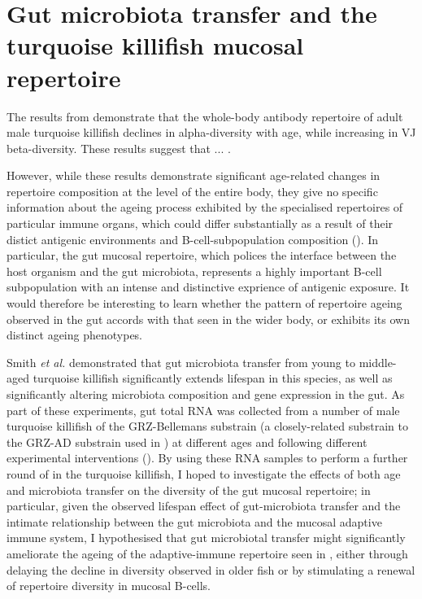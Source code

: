 
\section{Gut microbiota transfer and the turquoise killifish mucosal repertoire}
\label{sec:igseq_gut}

The results from  demonstrate that the whole-body antibody repertoire of adult male turquoise killifish declines in %
alpha-diversity with age, while increasing in VJ beta-diversity. %
These results suggest that ... . %

However, while these results demonstrate significant age-related changes in repertoire composition at the level of the entire body, they give no specific information about the ageing process exhibited by the specialised repertoires of particular immune organs, which could differ substantially as a result of their distict antigenic environments and B-cell-subpopulation composition (). In particular, the gut mucosal repertoire, which polices the interface between the host organism and the gut microbiota, represents a highly important B-cell subpopulation with an intense and distinctive exprience of antigenic exposure. %
It would therefore be interesting to learn whether the pattern of repertoire ageing observed in the gut accords with that seen in the wider body, or exhibits its own distinct ageing phenotypes.

Smith \textit{et al.} \parencite{smith2017microbiota} demonstrated that gut microbiota transfer from young to middle-aged turquoise killifish significantly extends lifespan in this species, as well as significantly altering microbiota composition and gene expression in the gut. As part of these experiments, gut total RNA was collected from a number of male turquoise killifish of the GRZ-Bellemans substrain (a closely-related substrain to the GRZ-AD substrain used in ) at different ages and following different experimental interventions (). By using these RNA samples to perform a further round of \Igseq in the turquoise killifish, I hoped to investigate the effects of both age and microbiota transfer on the diversity of the gut mucosal repertoire; in particular, given the observed lifespan effect of gut-microbiota transfer and the intimate relationship between the gut microbiota and the mucosal adaptive immune system, %
I hypothesised that gut microbiotal transfer might significantly ameliorate the ageing of the adaptive-immune repertoire seen in , either through delaying the decline in diversity observed in older fish or by stimulating a renewal of repertoire diversity in mucosal B-cells.

